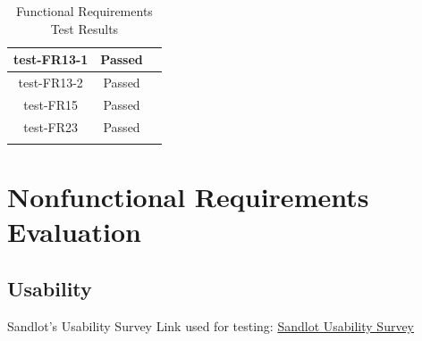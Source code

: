 \documentclass[12pt, titlepage]{article}
\begin{document}
\begin{longtable}{|c|c|p{8cm}|}
  \hline
  test-FR13-1 & Passed & \\
  \hline
  test-FR13-2 & Passed & \\
  \hline
  test-FR15 & Passed & \\
  \hline
  test-FR23 & Passed & \\
  \hline
  \caption{Functional Requirements Test Results}
\end{longtable}


\section{Nonfunctional Requirements Evaluation}

\subsection{Usability}

Sandlot's Usability Survey Link used for testing: \href{https://forms.office.com/Pages/ResponsePage.aspx?id=B2M3RCm0rUKMJSjNSW9HcodvkeIlB8lOjrmyIWuVT7dUQ0hBNFRVTjFHWVhITDIzSklZRDRYTVZRMi4u}{Sandlot Usability Survey}
\end{document}
